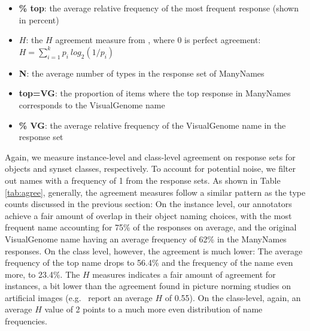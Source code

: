 \begin{itemize}
\item \textbf{\% top}: the average relative frequency of the most frequent response (shown in percent)
\item \textbf{$H$}: the $H$ agreement measure from \citet{snodgrass}, where 0 is perfect agreement: $H = \sum_{i=1}^k p_i\ log_2(1/p_i)$


\item \textbf{N}: the average number of types in the response set of ManyNames
\item \textbf{top=VG}: the proportion of items where the top response in ManyNames corresponds to the VisualGenome name
\item \textbf{\% VG}: the average relative frequency of the VisualGenome name in the response set

\end{itemize}

Again, we measure instance-level and class-level agreement on response sets for objects and synset classes, respectively.
To account for potential noise, we filter out names with a frequency of 1 from the response sets.
As shown in Table \ref{tab:agree}, generally, the agreement measures follow a similar pattern as the type counts discussed in the previous section:
On the instance level, our annotators achieve a fair amount of overlap in their object naming choices, with the most frequent name accounting for 75\% of the responses on average, and the original VisualGenome name having an average frequency of 62\% in the ManyNames responses. On the class level, however, the agreement is much lower: The average frequency of the top name drops to 56.4\% and the frequency of the \vgenome name even more, to 23.4\%. The $H$ measures indicates a fair amount of agreement for instances, a bit lower than the agreement found in picture norming studies on artificial images (e.g.\ \cite{snodgrass} report an average $H$ of 0.55). On the class-level, again, an average $H$ value of 2 points to a much more even distribution of name frequencies.

